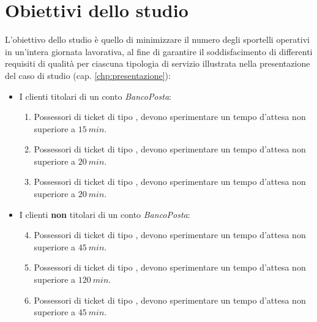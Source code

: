 \chapter{Obiettivi dello studio}\label{chp:obiettivi}
L'obiettivo dello studio è quello di minimizzare il numero degli sportelli operativi in un'intera giornata lavorativa, al fine di garantire il soddisfacimento di differenti requisiti di qualità per ciascuna tipologia di servizio illustrata nella presentazione del caso di studio (cap. \ref{chp:presentazione}):

\begin{itemize}
\item I clienti titolari di un conto \textsl{BancoPosta}:
\begin{enumerate}[label=QoS-\arabic*), align=left, leftmargin=*]
\item Possessori di ticket di tipo \uo{}, devono sperimentare un tempo d'attesa non superiore a $15\ min$.
\item Possessori di ticket di tipo \pp{}, devono sperimentare un tempo d'attesa non superiore a $20\ min$.
\item Possessori di ticket di tipo \sr{}, devono sperimentare un tempo d'attesa non superiore a $20\ min$.
\end{enumerate}
\item I clienti \textbf{non} titolari di un conto \textsl{BancoPosta}:
\begin{enumerate}[label=QoS-\arabic*), align=left, leftmargin=*]
\setcounter{enumi}{3}
\item Possessori di ticket di tipo \uo{}, devono sperimentare un tempo d'attesa non superiore a $45\ min$.
\item Possessori di ticket di tipo \pp{}, devono sperimentare un tempo d'attesa non superiore a $120\ min$.
\item Possessori di ticket di tipo \sr{}, devono sperimentare un tempo d'attesa non superiore a $45\ min$.
\end{enumerate}
\end{itemize}